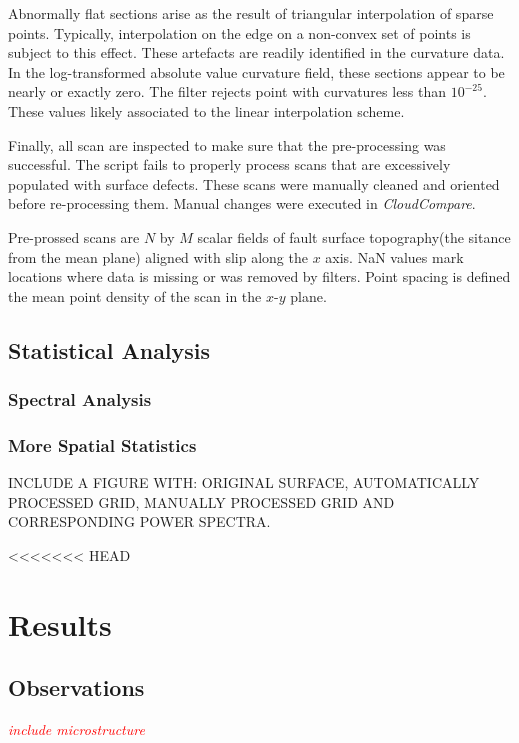 \documentclass[12pt,a4paper]{article}
\begin{document}
Abnormally flat sections arise as the result of triangular interpolation of sparse points. Typically, interpolation on the edge on a non-convex set of points is subject to this effect. These artefacts are readily identified in the curvature data. In the log-transformed absolute value curvature field, these sections appear to be nearly or exactly zero. The filter rejects point with curvatures less than $10^{-25}$. These values likely associated to the linear interpolation scheme.

Finally, all scan are inspected to make sure that the pre-processing was successful. The script fails to properly process scans that are excessively populated with surface defects. These scans were manually cleaned and oriented before re-processing them. Manual changes were executed in \textit{CloudCompare}. 

Pre-prossed scans are $N$ by $M$ scalar fields of fault surface topography(the sitance from the mean plane) aligned with slip along the $x$ axis. NaN values mark locations where data is missing or was removed by filters. Point spacing is defined the mean point density of the scan in the $x$-$y$ plane.
	\subsection{Statistical Analysis}
		

		\subsubsection{Spectral Analysis}
		

		\subsubsection{More Spatial Statistics}
	

INCLUDE A FIGURE WITH: ORIGINAL SURFACE, AUTOMATICALLY PROCESSED GRID, MANUALLY PROCESSED GRID AND CORRESPONDING POWER SPECTRA.

<<<<<<< HEAD
\section{Results}

	\subsection{Observations}
	
\textcolor{red}{\textit{include microstructure}}	
	
\end{document}
